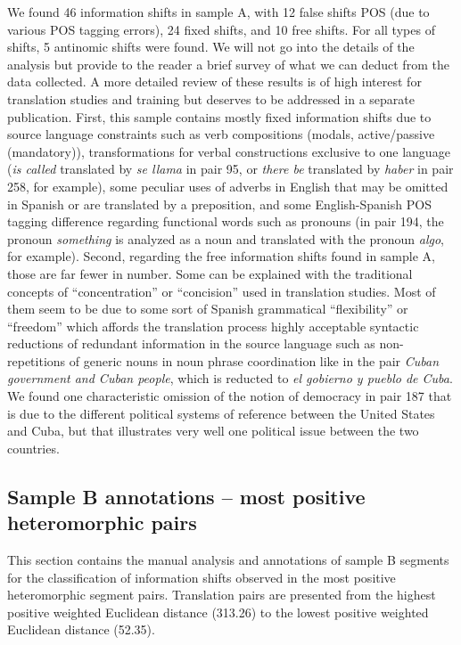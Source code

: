 \documentclass[output=paper]{langsci/langscibook}
\begin{document}
We found 46 information shifts in sample A, with 12 false shifts POS (due to various POS tagging errors), 24 fixed shifts, and 10 free shifts. For all types of shifts, 5 antinomic shifts were found. We will not go into the details of the analysis but provide to the reader a brief survey of what we can deduct from the data collected. A more detailed review of these results is of high interest for translation studies and training but deserves to be addressed in a separate publication. First, this sample contains mostly fixed information shifts due to source language constraints such as verb compositions (modals, active/passive (mandatory)), transformations for verbal constructions exclusive to one language (\textit{is called} translated by \textit{se llama} in pair 95, or \textit{there be} translated by \textit{haber} in pair 258, for example), some peculiar uses of adverbs in English that may be omitted in Spanish or are translated by a preposition, and some English-Spanish POS tagging difference regarding functional words such as pronouns (in pair 194, the pronoun \textit{something} is analyzed as a noun and translated with the pronoun \textit{algo}, for example). Second, regarding the free information shifts found in sample A, those are far fewer in number. Some can be explained with the traditional concepts of \enquote{concentration} or \enquote{concision} used in translation studies. Most of them seem to be due to some sort of Spanish grammatical \enquote{flexibility} or \enquote{freedom} which affords the translation process highly acceptable syntactic reductions of redundant information in the source language such as non-repetitions of generic nouns in noun phrase coordination like in the pair \textit{Cuban government and Cuban people}, which is reducted to \textit{el gobierno y pueblo de Cuba}. We found one characteristic omission of the notion of democracy in pair 187 that is due to the different political systems of reference between the United States and Cuba, but that illustrates very well one political issue between the two countries.

\subsection{Sample B annotations -- most positive heteromorphic pairs}

This section contains the manual analysis and annotations of sample B segments for the classification of information shifts observed in the most positive heteromorphic segment pairs. Translation pairs are presented from the highest positive weighted Euclidean distance (313.26) to the lowest positive weighted Euclidean distance (52.35).
\end{document}
